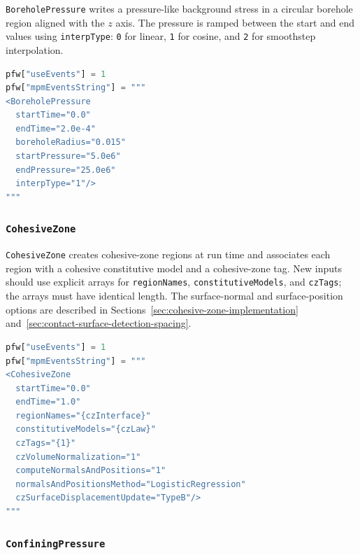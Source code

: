 \texttt{BoreholePressure} writes a pressure-like background stress in a circular borehole region aligned with the \(z\) axis.  The pressure is ramped between the start and end values using \texttt{interpType}: \texttt{0} for linear, \texttt{1} for cosine, and \texttt{2} for smoothstep interpolation.

\begin{lstlisting}[language=Python,caption={Borehole-pressure event.}]
pfw["useEvents"] = 1
pfw["mpmEventsString"] = """
<BoreholePressure
  startTime="0.0"
  endTime="2.0e-4"
  boreholeRadius="0.015"
  startPressure="5.0e6"
  endPressure="25.0e6"
  interpType="1"/>
"""
\end{lstlisting}

\subsubsection{\texttt{CohesiveZone}}

\texttt{CohesiveZone} creates cohesive-zone regions at run time and associates each region with a cohesive constitutive model and a cohesive-zone tag.  New inputs should use explicit arrays for \texttt{regionNames}, \texttt{constitutiveModels}, and \texttt{czTags}; the arrays must have identical length.  The surface-normal and surface-position options are described in Sections~\ref{sec:cohesive-zone-implementation} and~\ref{sec:contact-surface-detection-spacing}.

\begin{lstlisting}[language=Python,caption={Cohesive-zone insertion event.}]
pfw["useEvents"] = 1
pfw["mpmEventsString"] = """
<CohesiveZone
  startTime="0.0"
  endTime="1.0"
  regionNames="{czInterface}"
  constitutiveModels="{czLaw}"
  czTags="{1}"
  czVolumeNormalization="1"
  computeNormalsAndPositions="1"
  normalsAndPositionsMethod="LogisticRegression"
  czSurfaceDisplacementUpdate="TypeB"/>
"""
\end{lstlisting}

\subsubsection{\texttt{ConfiningPressure}}

